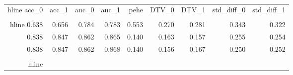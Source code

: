 \begin{table}[h]
\centering
\caption{}
\label{wd_para_6.0_wd_708.8859252929688}
\begin{tabular}{rrrrrrrrr}
\\hline
 acc\_0 &  acc\_1 &  auc\_0 &  auc\_1 &  pehe &  DTV\_0 &  DTV\_1 &  std\_diff\_0 &  std\_diff\_1 \\
\\hline
 0.638 &  0.656 &  0.784 &  0.783 & 0.553 &  0.270 &  0.281 &       0.343 &       0.322 \\
 0.838 &  0.847 &  0.862 &  0.865 & 0.140 &  0.163 &  0.157 &       0.255 &       0.254 \\
 0.838 &  0.847 &  0.862 &  0.868 & 0.140 &  0.156 &  0.167 &       0.250 &       0.252 \\
\\hline
\end{tabular}
\end{table}
